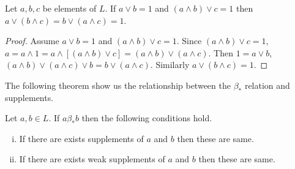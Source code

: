 \documentclass[handout]{beamer}
\begin{document}
\begin{frame}
\begin{lemma}\label{4.1.9}
  Let $ a,b,c $ be elements of $ L $.
  If $ a \vee b = 1 $ and $ ( a \wedge b ) \vee c =1 $
  then $ a \vee(b \wedge c)=b \vee ( a \wedge c ) = 1 $.
\end{lemma}
\begingroup
{}
\begin{proof}
  Assume $ a \vee b = 1 $ and $ ( a \wedge b ) \vee c = 1 $. Since $ ( a \wedge b ) \vee c = 1 $, $ a = a \wedge 1 = a \wedge \left[ ( a\wedge b ) \vee c \right]= ( a \wedge b ) \vee ( a \wedge c ) $. Then $ 1 = a\vee b $, 
  $ ( a \wedge b ) \vee ( a \wedge c ) \vee b = b \vee ( a \wedge c )$. Similarly $ a \vee ( b \wedge c ) = 1 $.
\end{proof}
\endgroup
\end{frame}

\begin{frame}
The following theorem show us the relationship between the $ \beta_* $ relation and supplements.
\pause
\begin{theorem}\label{4.1.10}
  Let $ a,b \in L $. If $ a\beta_* b $ then the following conditions hold.
  \begin{enumerate}[(i)]
    \item
      If there are exists supplements of $ a $ and $ b $ then these are same. \label{4.1.10.1}
    \item
      If there are exists weak supplements of $ a $ and $ b $ then these are same. \label{4.1.10.2}
  \end{enumerate}
\end{theorem}
\end{frame}
\end{document}

